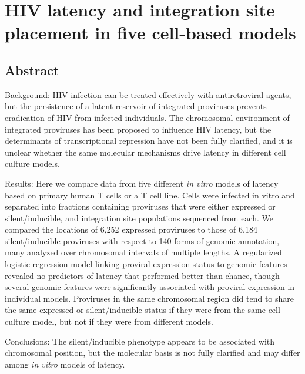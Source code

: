\documentclass[../sherrill-Mix_thesis.tex]{subfiles}
\begin{document}
\graphicspath{{im/}{latency/im/}}

\newcommand{\Active}{Active \cdFour} %
\newcommand{\Resting}{Resting \cdFour}
\newcommand{\Memory}{Central Memory \cdFour}
\newcommand{\Bcl}{Bcl-2 transduced \cdFour}
\newcommand{\Jurkat}{Jurkat}
\newcommand{\nFeatures}{140}
\newcommand{\nSites}{12,436}


\chapter{HIV latency and integration site placement in five cell-based models}
\label{chapLatency}
 
\section{Abstract}
	Background: HIV infection can be treated effectively with antiretroviral agents, but the persistence of a latent reservoir of integrated proviruses prevents eradication of HIV from infected individuals. The chromosomal environment of integrated proviruses has been proposed to influence HIV latency, but the determinants of transcriptional repression have not been fully clarified, and it is unclear whether the same molecular mechanisms drive latency in different cell culture models. 

	Results: Here we compare data from five different \textit{in vitro} models of latency based on primary human T cells or a T cell line.  Cells were infected in vitro and separated into fractions containing proviruses that were either expressed or silent/inducible, and integration site populations sequenced from each. We compared the locations of 6,252 expressed proviruses to those of 6,184 silent/inducible proviruses with respect to 140 forms of genomic annotation, many analyzed over chromosomal intervals of multiple lengths. A regularized logistic regression model linking proviral expression status to genomic features revealed no predictors of latency that performed better than chance, though several genomic features were significantly associated with proviral expression in individual models.  Proviruses in the same chromosomal region did tend to share the same expressed or silent/inducible status if they were from the same cell culture model, but not if they were from different models. 
	
	Conclusions: The silent/inducible phenotype appears to be associated with chromosomal position, but the molecular basis is not fully clarified and may differ among \textit{in vitro} models of latency.
\end{document}
